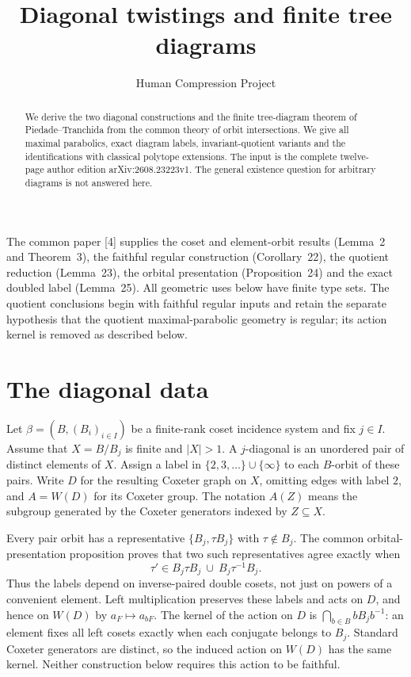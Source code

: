 
\title{Diagonal twistings and finite tree diagrams}
\author{Human Compression Project}\date{}
\maketitle
\begin{abstract}
We derive the two diagonal constructions and the finite tree-diagram theorem of Piedade--Tranchida from the common theory of orbit intersections. We give all maximal parabolics, exact diagram labels, invariant-quotient variants and the identifications with classical polytope extensions. The input is the complete twelve-page author edition arXiv:2608.23223v1. The general existence question for arbitrary diagrams is not answered here.
\end{abstract}
The common paper [4] supplies the coset and element-orbit results
(Lemma~2 and Theorem~3), the faithful regular construction
(Corollary~22), the quotient reduction (Lemma~23), the orbital
presentation (Proposition~24) and the exact doubled label (Lemma~25).
All geometric uses below have finite type sets. The quotient conclusions
begin with faithful regular inputs and retain the separate hypothesis
that the quotient maximal-parabolic geometry is regular; its action
kernel is removed as described below.

\section{The diagonal data}
Let $\beta=(B,(B_i)_{i\in I})$ be a finite-rank coset incidence system and fix $j\in I$. Assume that $X=B/B_j$ is finite and $|X|>1$. A $j$-diagonal is an unordered pair of distinct elements of $X$. Assign a label in $\{2,3,\ldots\}\cup\{\infty\}$ to each $B$-orbit of these pairs. Write $D$ for the resulting Coxeter graph on $X$, omitting edges with label $2$, and $A=W(D)$ for its Coxeter group. The notation $A(Z)$ means the subgroup generated by the Coxeter generators indexed by $Z\subseteq X$.

Every pair orbit has a representative $\{B_j,\tau B_j\}$ with $\tau\notin B_j$. The common orbital-presentation proposition proves that two such representatives agree exactly when
\[
\tau'\in B_j\tau B_j\ \cup\ B_j\tau^{-1}B_j.
\]
Thus the labels depend on inverse-paired double cosets, not just on powers of a convenient element. Left multiplication preserves these labels and acts on $D$, and hence on $W(D)$ by $a_F\mapsto a_{bF}$. The kernel of the action on $D$ is $\bigcap_{b\in B}bB_jb^{-1}$: an element fixes all left cosets exactly when each conjugate belongs to $B_j$. Standard Coxeter generators are distinct, so the induced action on $W(D)$ has the same kernel. Neither construction below requires this action to be faithful.

